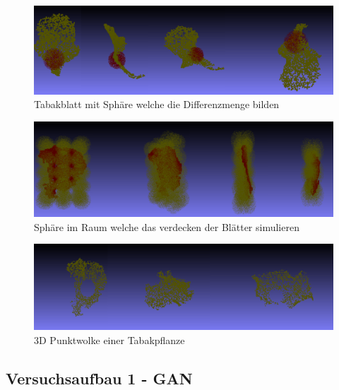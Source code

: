 \documentclass{llncs}
\begin{document}
\begin{figure}[htbp] 
	\centering
	\includegraphics[width=1.0\textwidth]{sphere1.png}
	\caption{Tabakblatt mit Sphäre welche die Differenzmenge bilden}
	\label{fig:Bild52}
\end{figure}

\begin{figure}[htbp] 
	\centering
	\includegraphics[width=1.0\textwidth]{allsphere.png}
	\caption{Sphäre im Raum welche das verdecken der Blätter simulieren}
	\label{fig:Bild53}
\end{figure}

\begin{figure}[htbp] 
	\centering
	\includegraphics[width=1.0\textwidth]{training_destroyed.png}
	\caption{3D Punktwolke einer Tabakpflanze}
	\label{fig:Bild54}
\end{figure}
\newpage


\subsection{Versuchsaufbau 1 - GAN}\label{sec:versuch1-aufbau}
\end{document}
